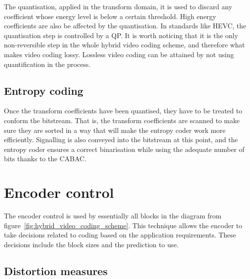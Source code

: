 \documentclass[11pt,a4paper,openright,twoside]{book}
\numberwithin{equation}{section} %
\begin{document}
The quantisation, applied in the transform domain, it is used to discard
any coefficient whose energy level is below a certain threshold.
High energy coefficients are also be affected by the quantisation.
In standards like \acs{HEVC}, the quantisation step is controlled by a
\ac{QP}.
It is worth noticing that it is the only non-reversible step in the whole
hybrid video coding scheme, and therefore what makes video coding lossy.
Lossless video coding can be attained by not using quantification in the
process.


\subsection{Entropy coding}
\label{sub:entropy_coding}

Once the transform coefficients have been quantised, they have to be
treated to conform the bitstream.
That is, the transform coefficients are scanned to make sure they are
sorted in a way that will make the entropy coder work more efficiently.
Signalling is also conveyed into the bitstream at this point, and the
entropy coder ensures a correct binarisation while using the adequate
number of bits thanks to the \ac{CABAC}.

\section{Encoder control}
\label{sec:encoder_control}

The encoder control is used by essentially all blocks in the diagram
from figure~\ref{fig:hybrid_video_coding_scheme}.
This technique allows the encoder to take decisions related to coding
based on the application requirements.
These decisions include the block sizes and the prediction to use.

\subsection{Distortion measures}
\label{sub:distortion_measures}
\end{document}
